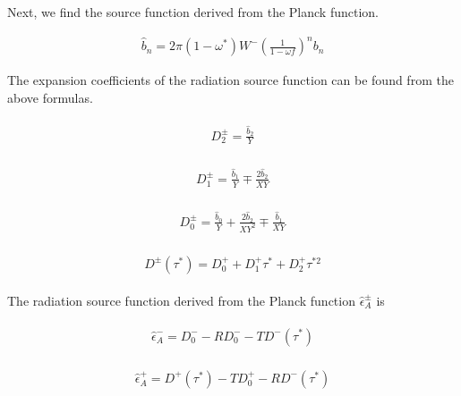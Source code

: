 Next, we find the source function derived from the Planck function.

\begin{eqnarray}
\hat{b}_{n}=2 \pi\left(1-\omega^{*}\right) W^{-}\left(\frac{1}{1-\omega f}\right)^{n} b_{n}
\end{eqnarray}

The expansion coefficients of the radiation source function can be found from the above formulas.

\begin{eqnarray}
\begin{array}{l}
D_{2}^{\pm}=\frac{\hat{b}_{2}}{Y}
\end{array}
\end{eqnarray}

\begin{eqnarray}
\begin{array}{l}
D_{1}^{\pm}=\frac{\hat{b}_{1}}{Y} \mp \frac{2 \hat{b}_{2}}{X Y}
\end{array}
\end{eqnarray}

\begin{eqnarray}
\begin{array}{l}
D_{0}^{\pm}=\frac{\hat{b}_{0}}{Y}+\frac{2 \hat{b}_{2}}{X Y^{2}} \mp \frac{\hat{b}_{1}}{X Y}
\end{array}
\end{eqnarray}

\begin{eqnarray}
\begin{array}{l}
D^{\pm}\left(\tau^{*}\right)=D_{0}^{+}+D_{1}^{+} \tau^{*}+D_{2}^{+} \tau^{* 2}
\end{array}
\end{eqnarray}

The radiation source function derived from the Planck function \(\hat{\epsilon}_{A}^{\pm}\) is

\begin{eqnarray}
\begin{array}{l}
\hat{\epsilon}_{A}^{-}=D_{0}^{-}-R D_{0}^{-}-T D^{-}\left(\tau^{*}\right)
\end{array}
\end{eqnarray}

\begin{eqnarray}
\begin{array}{l}
\hat{\epsilon}_{A}^{+}=D^{+}\left(\tau^{*}\right)-T D_{0}^{+}-R D^{-}\left(\tau^{*}\right)
\end{array}
\end{eqnarray}

